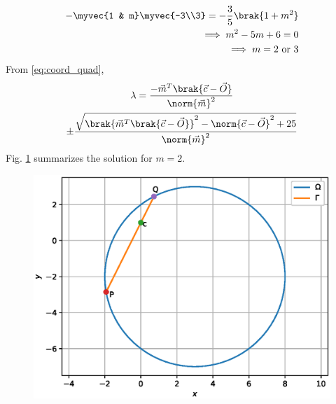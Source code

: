 \begin{enumerate}[label=\arabic*.,ref=\thesubsection.\theenumi]
\begin{align}
-\myvec{1 & m}\myvec{-3\\3}= -\frac{3}{5}\brak{1+m^2}
\\
\implies m^2 -5m + 6 = 0
\\
\implies m = 2 \text{ or } 3
\end{align}
From \eqref{eq:coord_quad}, 
\begin{multline}
\lambda = \frac{-\vec{m}^{T}\brak{\vec{c} -\vec{O}}}{{\norm{\vec{m}}^2}}
\\
\pm \frac{\sqrt{\brak{\vec{m}^{T}\brak{\vec{c} -\vec{O}}}^2
-\norm{\vec{c} -\vec{O}}^2+25}}{\norm{\vec{m}}^2}
\end{multline}
Fig. \ref{fig:2019_3} summarizes the solution for $m = 2$.


\begin{figure}
\centering
\includegraphics[width=\columnwidth]{./circle/figs/2019_3.eps}
\caption{}
\label{fig:2019_3}
\end{figure}
\end{enumerate}
